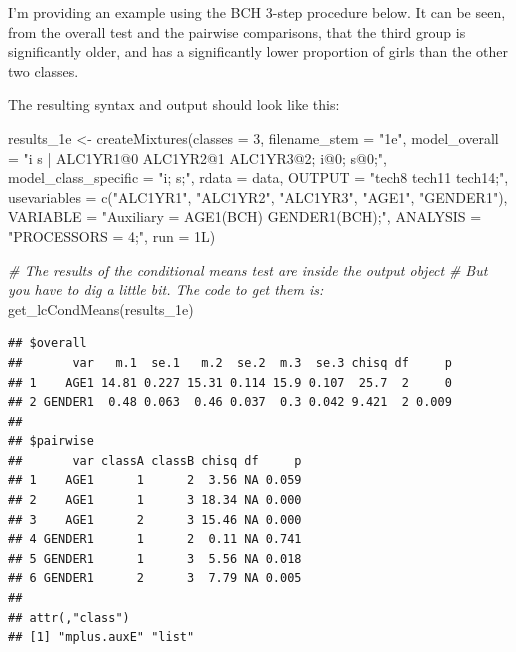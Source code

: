 \documentclass[
]{book}
\newenvironment{Shaded}{\begin{snugshade}}{\end{snugshade}}
\newcommand{\AttributeTok}[1]{\textcolor[rgb]{0.77,0.63,0.00}{#1}}
\newcommand{\CommentTok}[1]{\textcolor[rgb]{0.56,0.35,0.01}{\textit{#1}}}
\newcommand{\DecValTok}[1]{\textcolor[rgb]{0.00,0.00,0.81}{#1}}
\newcommand{\FunctionTok}[1]{\textcolor[rgb]{0.00,0.00,0.00}{#1}}
\newcommand{\NormalTok}[1]{#1}
\newcommand{\OtherTok}[1]{\textcolor[rgb]{0.56,0.35,0.01}{#1}}
\newcommand{\StringTok}[1]{\textcolor[rgb]{0.31,0.60,0.02}{#1}}
\begin{document}
I'm providing an example using the BCH 3-step procedure below. It can be seen, from the overall test and the pairwise comparisons, that the third group is significantly older, and has a significantly lower proportion of girls than the other two classes.

The resulting syntax and output should look like this:

\begin{Shaded}
\begin{Highlighting}[]
\NormalTok{results\_1e }\OtherTok{\textless{}{-}}
  \FunctionTok{createMixtures}\NormalTok{(}\AttributeTok{classes =} \DecValTok{3}\NormalTok{,}
                 \AttributeTok{filename\_stem =} \StringTok{"1e"}\NormalTok{, }
                 \AttributeTok{model\_overall =} \StringTok{"i s | ALC1YR1@0 ALC1YR2@1 ALC1YR3@2;}
\StringTok{                                  i@0;  s@0;"}\NormalTok{,}
                 \AttributeTok{model\_class\_specific =} \StringTok{"i;  s;"}\NormalTok{,}
                 \AttributeTok{rdata =}\NormalTok{ data,}
                 \AttributeTok{OUTPUT =} \StringTok{"tech8 tech11 tech14;"}\NormalTok{,}
                 \AttributeTok{usevariables =} \FunctionTok{c}\NormalTok{(}\StringTok{"ALC1YR1"}\NormalTok{, }\StringTok{"ALC1YR2"}\NormalTok{, }\StringTok{"ALC1YR3"}\NormalTok{,}
                                  \StringTok{"AGE1"}\NormalTok{, }\StringTok{"GENDER1"}\NormalTok{),}
                 \AttributeTok{VARIABLE =} \StringTok{"Auxiliary = AGE1(BCH)  GENDER1(BCH);"}\NormalTok{,}
                 \AttributeTok{ANALYSIS =} \StringTok{"PROCESSORS = 4;"}\NormalTok{,}
                 \AttributeTok{run =}\NormalTok{ 1L)}

\CommentTok{\# The results of the conditional means test are inside the output object}
\CommentTok{\# But you have to dig a little bit. The code to get them is:}
\FunctionTok{get\_lcCondMeans}\NormalTok{(results\_1e)}
\end{Highlighting}
\end{Shaded}

\begin{verbatim}
## $overall
##       var   m.1  se.1   m.2  se.2  m.3  se.3 chisq df     p
## 1    AGE1 14.81 0.227 15.31 0.114 15.9 0.107  25.7  2     0
## 2 GENDER1  0.48 0.063  0.46 0.037  0.3 0.042 9.421  2 0.009
## 
## $pairwise
##       var classA classB chisq df     p
## 1    AGE1      1      2  3.56 NA 0.059
## 2    AGE1      1      3 18.34 NA 0.000
## 3    AGE1      2      3 15.46 NA 0.000
## 4 GENDER1      1      2  0.11 NA 0.741
## 5 GENDER1      1      3  5.56 NA 0.018
## 6 GENDER1      2      3  7.79 NA 0.005
## 
## attr(,"class")
## [1] "mplus.auxE" "list"
\end{verbatim}
\end{document}
